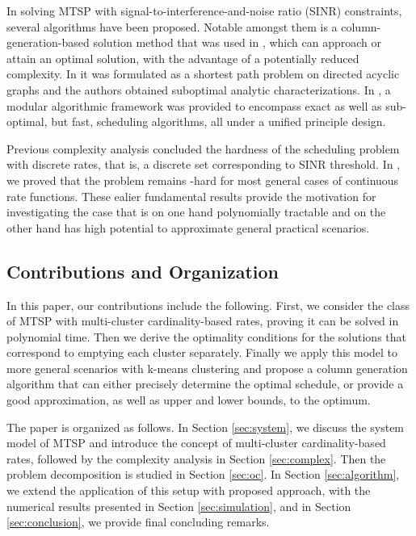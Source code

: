 \documentclass[10pt,onecolumn,journal,draftcls,oneside]{IEEEtran}
\newcounter{cond}
\newcounter{rema}
\begin{document}
In solving MTSP with signal-to-interference-and-noise ratio (SINR) constraints, several algorithms have been proposed. Notable amongst them is a column-generation-based solution method that was used in \cite{KoWi10}, which can approach or attain an optimal solution, with the advantage of a potentially reduced complexity. In \cite{PaEp08} it was formulated as a shortest path problem on directed acyclic graphs and the authors obtained suboptimal analytic characterizations. In \cite{isita2}, a modular algorithmic framework was provided to encompass exact as well as sub-optimal, but fast, scheduling algorithms, all under a unified principle design.

Previous complexity analysis \cite{Ar84,BjVaYu04,BoLiXi10,GoPsWa07} concluded the hardness of the scheduling problem with discrete rates, that is, a discrete set corresponding to SINR threshold. In \cite{j12}, we proved that the problem remains -hard for most general cases of continuous rate functions. These ealier fundamental results provide the motivation for investigating the case that is on one hand polynomially tractable and on the other hand has high potential to approximate general practical scenarios.

\subsection{Contributions and Organization}
In this paper, our contributions include the following. First, we consider the class of MTSP with multi-cluster cardinality-based rates, proving it can be solved in polynomial time. Then we derive the optimality conditions for the solutions that correspond to emptying each cluster separately. Finally we apply this model to more general scenarios with k-means clustering and propose a column generation algorithm that can either precisely determine the optimal schedule, or provide a good approximation, as well as upper and lower bounds, to the optimum.

The paper is organized as follows. In Section \ref{sec:system}, we discuss the system model of MTSP and introduce the concept of multi-cluster cardinality-based rates, followed by the complexity analysis in Section \ref{sec:complex}. Then the problem decomposition is studied in Section \ref{sec:oc}. In Section \ref{sec:algorithm}, we extend the application of this setup with proposed approach, with the numerical results presented in Section \ref{sec:simulation}, and in Section \ref{sec:conclusion}, we provide final concluding remarks.
\end{document}
